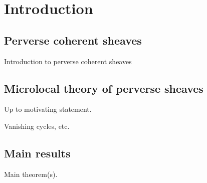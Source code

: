 \chapter{Introduction}

\section{Perverse coherent sheaves}
Introduction to perverse coherent sheaves

\section{Microlocal theory of perverse sheaves}
Up to motivating statement.
\begin{Thm}
    \label{thm:motivation}%
    Vanishing cycles, etc.
\end{Thm}

\section{Main results}
Main theorem(s).
